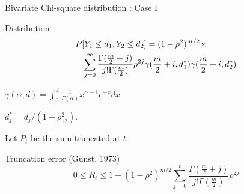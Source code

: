\documentclass{slides}
\begin{document}
\begin{slide}
\begin{center}
Bivariate Chi-square distribution : Case I
\end{center}

Distribution \\
\begin{eqnarray*}
\lefteqn{ P[Y_1 \leq d_1, Y_2 \leq d_2] = 
  (1-\rho^2)^{m/2} \times } \\
  & & \sum_{j=0}^\infty 
  \frac{\Gamma (\frac{m}{2}+j)}{j! \Gamma (\frac{m}{2})}
  \rho^{2j} 
  \gamma( \frac{m}{2}+i , d_1^*)
  \gamma( \frac{m}{2}+i , d_2^*)
\end{eqnarray*}

$\gamma(\alpha, d) = 
          \int_0^d   \frac{1}{\Gamma(\alpha)} x^{\alpha -1} e^{-x} dx $

$ d_j^* = d_j / (1-\rho^2_{12}) $.

Let $P_t$ be the sum truncated at $t$

Truncation error (Gunst, 1973)
\begin{equation}
\label{error1}
0 \leq R_t \leq 1- (1-\rho^2)^{m/2}
  \sum_{j=0}^t \frac{\Gamma (\frac{m}{2}+j)}{ j! \Gamma (\frac{m}{2}) }
  \rho^{2j} 
\end{equation}

\end{slide}
\end{document}
